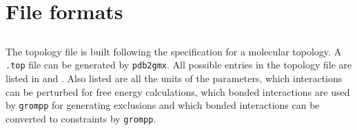 \section{File formats}
\subsection{}
\label{subsec:topfile}
The topology file is built following the {\gromacs} specification for a
molecular topology.  A {\tt *.top} file can be generated by
{\tt pdb2gmx}.
All possible entries in the topology file are listed in
 and . Also listed are all the units
of the parameters, which interactions can be perturbed for free energy
calculations, which bonded interactions are used by {\tt grompp}
for generating exclusions and which bonded interactions can be converted
to constraints by {\tt grompp}.

